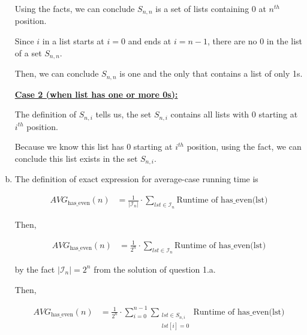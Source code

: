 \documentclass[12pt]{article}
\begin{document}
\begin{enumerate}[a.]
\begin{mdframed}
        \bigskip

        Using the facts, we can conclude $S_{n,n}$ is a set of lists containing 0 at $n^{th}$
        position.

        \bigskip

        Since $i$ in a list starts at $i = 0$ and ends at $i = n-1$, there are no 0
        in the list of a set $S_{n,n}$.

        \bigskip

        Then, we can conclude $S_{n,n}$ is one and the only that contains a list of only 1s.

        \bigskip

        \underline{\textbf{Case 2 (when list has one or more 0s):}}

        \bigskip

        \color{red}
        The definition of $S_{n,i}$ tells us, the set $S_{n,i}$ contains
        all lists with 0 starting at $i^{th}$ position.
        \color{black}

        \bigskip

        Because we know this list has 0 starting at $i^{th}$ position, \color{red}using the
        fact\color{black}, we can conclude this list exists in the set $S_{n,i}$.

    \end{mdframed}


    \item

    The definition of exact expression for average-case running time is

    \setcounter{equation}{0}
    \begin{align}
        AVG_{\text{has\_even}}(n) &= \frac{1}{\lvert \mathcal{I}_n \rvert} \cdot \sum\limits_{lst \in \mathcal{I}_n} \text{Runtime of has\_even(lst)}
    \end{align}

    \bigskip

    Then,

    \begin{align}
        AVG_{\text{has\_even}}(n) &= \frac{1}{2^n} \cdot \sum\limits_{lst \in \mathcal{I}_n} \text{Runtime of has\_even(lst)}
    \end{align}

    by the fact $\lvert \mathcal{I}_n \rvert = 2^n$ from the solution of question 1.a.

    \bigskip

    Then,

    \begin{align}
        AVG_{\text{has\_even}}(n) &= \frac{1}{2^n} \cdot \sum\limits_{i=0}^{n-1} \sum\limits_{\substack{lst \in S_{n,i}\\ lst[i]=0}} \text{Runtime of has\_even(lst)}
    \end{align}


\end{enumerate}
\end{document}
